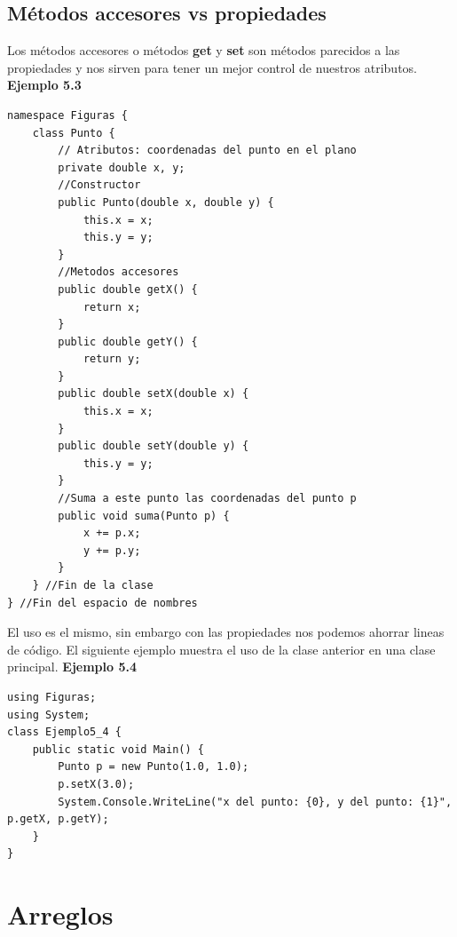 \documentclass[12pt,a4paper]{report}
\begin{document}
\section{Métodos accesores vs propiedades}
Los métodos accesores o métodos \textbf{get} y \textbf{set} son métodos parecidos a las propiedades y nos sirven para tener un mejor control de nuestros atributos. \textbf{Ejemplo 5.3}
\begin{lstlisting}
namespace Figuras {
	class Punto {
		// Atributos: coordenadas del punto en el plano
		private double x, y;
		//Constructor
		public Punto(double x, double y) {
			this.x = x;
			this.y = y;		
		}
		//Metodos accesores
		public double getX() {
			return x;
		}
		public double getY() {
			return y;
		}
		public double setX(double x) {
			this.x = x;
		}
		public double setY(double y) {
			this.y = y;
		}
		//Suma a este punto las coordenadas del punto p
		public void suma(Punto p) {
			x += p.x;
			y += p.y;		
		} 
	} //Fin de la clase
} //Fin del espacio de nombres
\end{lstlisting}El uso es el mismo, sin embargo con las propiedades nos podemos ahorrar lineas de código. El siguiente ejemplo muestra el uso de la clase anterior en una clase principal.
\textbf{Ejemplo 5.4}
\begin{lstlisting}
using Figuras;
using System;
class Ejemplo5_4 {
	public static void Main() {
		Punto p = new Punto(1.0, 1.0);
		p.setX(3.0);
		System.Console.WriteLine("x del punto: {0}, y del punto: {1}", p.getX, p.getY);	
	}
}
\end{lstlisting}
\chapter{Arreglos}
\end{document}
